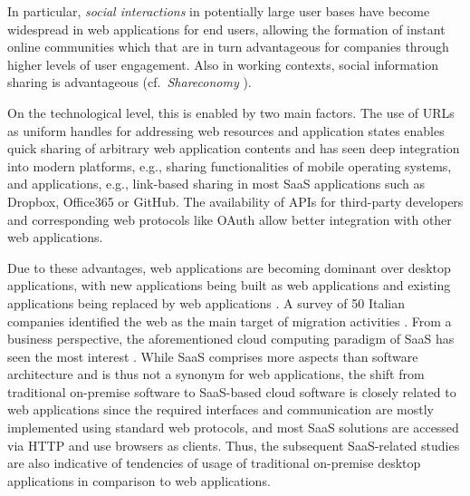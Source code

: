 In particular, \emph{social interactions} in potentially large user bases have become widespread in web applications for end users, allowing the formation of instant online communities \autocite{Bressler2000OnlineCommunities} which that are in turn advantageous for companies through higher levels of user engagement.
Also in working contexts, social information sharing is advantageous (cf.~\emph{Shareconomy} \autocite{Bitkom2013Arbeit30}).

On the technological level, this is enabled by two main factors.
The use of URLs as uniform handles for addressing web resources and application states enables quick sharing of arbitrary web application contents and has seen deep integration into modern platforms, e.g., sharing functionalities of mobile operating systems, and applications, e.g., link-based sharing in most SaaS applications such as Dropbox, Office365 or GitHub.
The availability of APIs for third-party developers and corresponding web protocols like OAuth allow better integration with other web applications.

Due to these advantages, web applications are becoming dominant over desktop applications, with new applications being built as web applications \autocite{BetterCloud2017SaaSWorkplace} and existing applications being replaced by web applications \autocite{Gartner2012SaaSSurvey}.
A survey of 50 Italian companies identified the web as the main target of migration activities \autocite{Torchiano2008ItalianSurvey}.
From a business perspective, the aforementioned cloud computing paradigm of SaaS has seen the most interest \autocite{Statista2018SaaSStatistics}.
While SaaS comprises more aspects than software architecture and is thus not a synonym for web applications, the shift from traditional on-premise software to SaaS-based cloud software is closely related to web applications since the required interfaces and communication are mostly implemented using standard web protocols, and most SaaS solutions are accessed via HTTP and use browsers as clients.
Thus, the subsequent SaaS-related studies are also indicative of tendencies of usage of traditional on-premise desktop applications in comparison to web applications.

